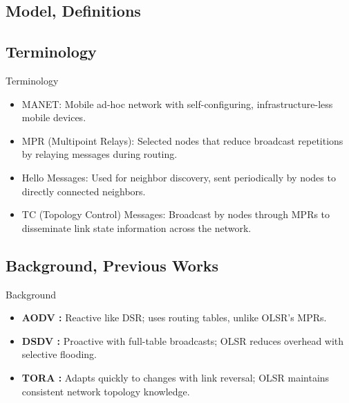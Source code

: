 \documentclass[11pt]{beamer}              %
\begin{document}
\subsection{Model, Definitions}


\subsection{Terminology}
\begin{frame}{Terminology}
\begin{itemize}
    \item MANET: Mobile ad-hoc network with self-configuring, infrastructure-less mobile devices.
    \item MPR (Multipoint Relays): Selected nodes that reduce broadcast repetitions by relaying messages during routing.
    \item Hello Messages: Used for neighbor discovery, sent periodically by nodes to directly connected neighbors.
    \item TC (Topology Control) Messages: Broadcast by nodes through MPRs to disseminate link state information across the network.
\end{itemize}
    
\end{frame}

\subsection{Background, Previous Works}
\begin{frame}{Background}
    \begin{itemize}
        \item \textbf{AODV \cite{Perkins1999}:} Reactive like DSR; uses routing tables, unlike OLSR's MPRs.
        \item \textbf{DSDV \cite{Perkins1994}:} Proactive with full-table broadcasts; OLSR reduces overhead with selective flooding.
        \item \textbf{TORA \cite{Park}:} Adapts quickly to changes with link reversal; OLSR maintains consistent network topology knowledge.
    \end{itemize}
\end{frame}
\end{document}
